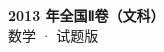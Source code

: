 \documentclass[zihao=-4, a4paper]{ctexart}
\begin{document}
\begin{center}
  {\Large\bfseries 2013 年全国Ⅱ卷（文科）}\\[4pt]
  {\large 数学 · 试题版}
\end{center}
\medskip
{}

\end{document}
